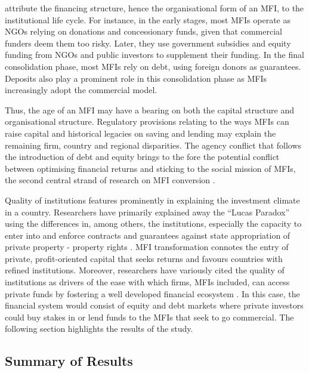 \documentclass[a4paper,nobind]{templates/ociamthesis}
\begin{document}
\textcite{ledgerwood2006transforming} attribute the financing structure, hence the organisational form of an MFI, to the institutional life cycle. For instance, in the early stages, most MFIs operate as NGOs relying on donations and concessionary funds, given that commercial funders deem them too risky. Later, they use government subsidies and equity funding from NGOs and public investors to supplement their funding. In the final consolidation phase, most MFIs rely on debt, using foreign donors as guarantees. Deposits also play a prominent role in this consolidation phase as MFIs increasingly adopt the commercial model.

Thus, the age of an MFI may have a bearing on both the capital structure and organisational structure. Regulatory provisions relating to the ways MFIs can raise capital and historical legacies on saving and lending \autocite{bayai2016financing} may explain the remaining firm, country and regional disparities. The agency conflict that follows the introduction of debt and equity brings to the fore the potential conflict between optimising financial returns and sticking to the social mission of MFIs, the second central strand of research on MFI conversion \autocite{nurmakhanova2015trade,bayai2016financing,abdulai2017trade,awaworyi2018sustainability}.

Quality of institutions features prominently in explaining the investment climate in a country. Researchers have primarily explained away the ``Lucas Paradox'' using the differences in, among others, the institutions, especially the capacity to enter into and enforce contracts and guarantees against state appropriation of private property - property rights \autocite{azemar2013has,goktan2015explanation}. MFI transformation connotes the entry of private, profit-oriented capital that seeks returns and favours countries with refined institutions. Moreover, researchers have variously cited the quality of institutions as drivers of the ease with which firms, MFIs included, can access private funds by fostering a well developed financial ecosystem \autocite{huang2010political,kaidi2019financial}. In this case, the financial system would consist of equity and debt markets where private investors could buy stakes in or lend funds to the MFIs that seek to go commercial. The following section highlights the results of the study.

\hypertarget{summary-of-results}{%
\subsection{Summary of Results}\label{summary-of-results}}
\end{document}
